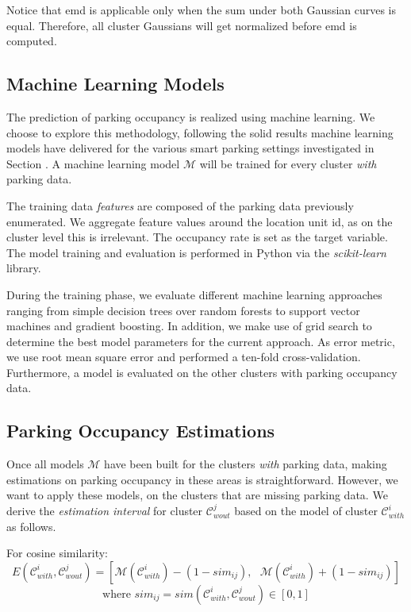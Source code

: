 Notice that emd is applicable only when the sum under both Gaussian curves is equal.
Therefore, all cluster Gaussians will get normalized before emd is computed.

\subsection{Machine Learning Models}
\label{realization:machine_learning_models}
The prediction of parking occupancy is realized using machine learning.
We choose to explore this methodology, following the solid results machine learning models have delivered for the various smart parking settings investigated in Section . A machine learning model $\mathcal{M}$ will be trained for every cluster \textit{with} parking data.

The training data \textit{features} are composed of the parking data previously enumerated. We aggregate feature values around the location unit id, as on the cluster level this is irrelevant. The occupancy rate is set as the target variable. The model training and evaluation is performed in Python via the \textit{scikit-learn} library.

During the training phase, we evaluate different machine learning approaches ranging from simple decision trees over random forests to support vector machines and gradient boosting. In addition, we make use of grid search to determine the best model parameters for the current approach. As error metric, we use root mean square error and performed a ten-fold cross-validation. Furthermore, a model is evaluated on the other clusters with parking occupancy data.

\subsection{Parking Occupancy Estimations}
\label{realization:parking_occupancy_estimations}
Once all models $\mathcal{M}$ have been built for the clusters \textit{with} parking data, making estimations on parking occupancy in these areas is straightforward. However, we want to apply these models, on the clusters that are missing parking data. We derive the \textit{estimation interval} for cluster $\mathcal{C}_{wout}^j$ based on the model of cluster $\mathcal{C}_{with}^i$ as follows.

For cosine similarity:
\begin{equation}
E(\mathcal{C}_{with}^i,\mathcal{C}_{wout}^j) = [\mathcal{M}(\mathcal{C}_{with}^i) - (1 - sim_{ij}), \text{    } \mathcal{M}(\mathcal{C}_{with}^i) + (1 - sim_{ij})]
\end{equation}
$$\text{where } sim_{ij} = sim(\mathcal{C}_{with}^i,\mathcal{C}_{wout}^j) \in [0,1]$$

